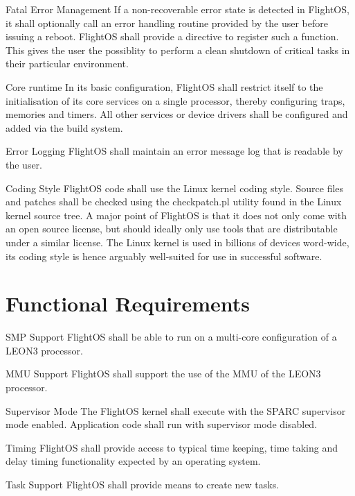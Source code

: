  {Fatal Error Management}{%
If a non-recoverable error state is detected in FlightOS, it shall optionally
call an error handling routine provided by the user before issuing a reboot.
FlightOS shall provide a directive to register such a function.
}{%
This gives the user the possiblity to perform a clean shutdown of critical
tasks in their particular environment.}%


 {Core runtime}{%
In its basic configuration, FlightOS shall restrict itself to the initialisation
of its core services on a single processor, thereby configuring traps, memories
and timers. All other services or device drivers shall be configured and added
via the build system.
}{}%

 {Error Logging}{%
FlightOS shall maintain an error message log that is readable by the user.
}{}%

 {Coding Style}{%
FlightOS code shall use the Linux kernel coding style. Source files and patches
shall be checked using the checkpatch.pl utility found in the Linux kernel
source tree.
}{%
A major point of FlightOS is that it does not only come with an open source
license, but should ideally only use tools that are distributable under a
similar license. The Linux kernel is used in billions of devices word-wide,
its coding style is hence arguably well-suited for use in successful software.
}%


\section{Functional Requirements}

 {SMP Support}{%
FlightOS shall be able to run on a multi-core configuration of a LEON3 processor.
}{}%

 {MMU Support}{%
FlightOS shall support the use of the MMU of the LEON3 processor.
}{}%

 {Supervisor Mode}{%
The FlightOS kernel shall execute with the SPARC supervisor mode enabled.
Application code shall run with supervisor mode disabled.
}{}%

 {Timing}{%
FlightOS shall provide access to typical time keeping, time taking and delay
timing functionality expected by an operating system.
}{}%


 {Task Support}{%
FlightOS shall provide means to create new tasks.
}{}%

